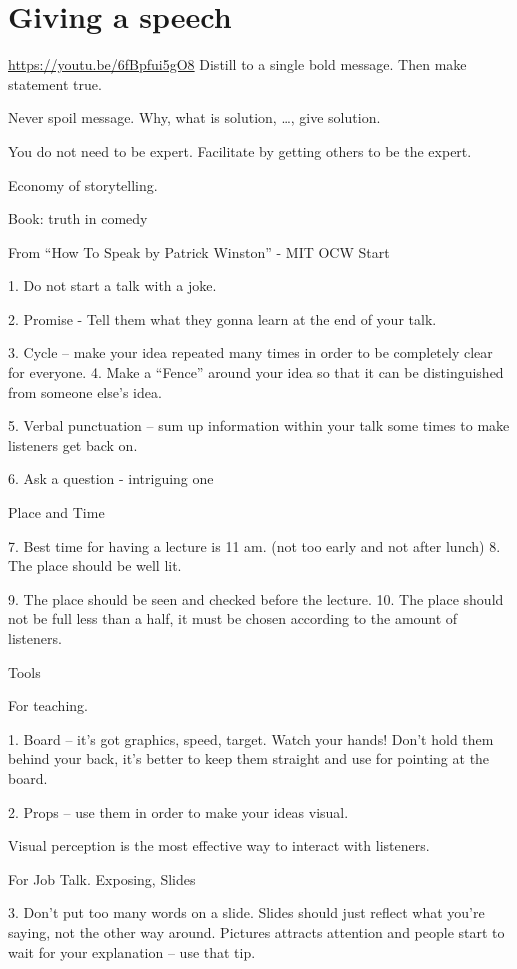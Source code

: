 \documentclass{report}
\begin{document}
\section{Giving a speech}
\url{https://youtu.be/6fBpfui5gO8}
Distill to a single bold message. Then make statement true.

Never spoil message. Why, what is solution, \ldots, give solution.

You do not need to be expert. Facilitate by getting others to be the expert.

Economy of storytelling.

Book: truth in comedy

From ``How To Speak by Patrick Winston'' - MIT OCW
Start

1. Do not start a talk with a joke.

2. Promise - Tell them what they gonna learn at the end of your talk.

3. Cycle – make your idea repeated many times in order to be completely clear for everyone.
4. Make a “Fence” around your idea so that it can be distinguished from someone else’s idea.

5. Verbal punctuation – sum up information within your talk some times to make listeners get back on.

6.  Ask a question - intriguing one


Place and Time



7. Best time for having a lecture is 11 am.
 (not too early and not after lunch)
8. The place should be well lit.

9. The place should be seen and checked before the lecture.
10. The place should not be full less than a half, it must be chosen according to the amount of listeners.



Tools

For teaching.

1. Board – it’s got graphics, speed, target. Watch your hands! Don’t hold them behind your back, it’s better to keep them straight and use for pointing at the board.

2. Props – use them in order to make your ideas visual.

Visual perception is the most effective way to interact with listeners.



For Job Talk. Exposing, Slides

3. Don’t put too many words on a slide. Slides should just reflect what you’re saying, not the other way around. Pictures attracts attention and people start to wait for your explanation – use that tip.
\end{document}
